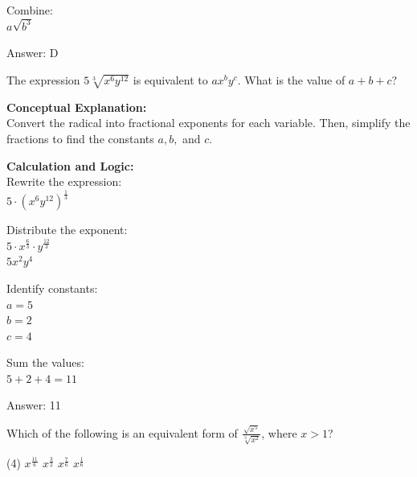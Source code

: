 \documentclass[11pt,paper=a4,answers]{exam}
\begin{document}
\begin{questions}
\begin{solution}
\vspace{10pt}

Combine: \\
$a\sqrt{b^3}$

\vspace{25pt}

Answer: \colorbox{yellow!100}{D}
\end{solution}

\vspace{40pt}

\question
The expression $5\sqrt[3]{x^6 y^{12}}$ is equivalent to $ax^b y^c$. What is the value of $a + b + c$?

\begin{solution}
\textbf{Conceptual Explanation:} \\
Convert the radical into fractional exponents for each variable. Then, simplify the fractions to find the constants $a, b,$ and $c$.

\vspace{20pt}

\textbf{Calculation and Logic:} \\
Rewrite the expression: \\
$5 \cdot (x^6 y^{12})^{\frac{1}{3}}$

\vspace{10pt}

Distribute the exponent: \\
$5 \cdot x^{\frac{6}{3}} \cdot y^{\frac{12}{3}}$ \\
$5x^2 y^4$

\vspace{10pt}

Identify constants: \\
$a = 5$ \\
$b = 2$ \\
$c = 4$

\vspace{10pt}

Sum the values: \\
$5 + 2 + 4 = 11$

\vspace{25pt}

Answer: \colorbox{yellow!100}{11}
\end{solution}

\vspace{40pt}

\question
Which of the following is an equivalent form of $\frac{\sqrt{x^5}}{\sqrt[3]{x^2}}$, where $x > 1$?
\begin{tasks}(4)
    \task $x^{\frac{11}{6}}$
    \task $x^{\frac{3}{2}}$
    \task $x^{\frac{7}{6}}$
    \task $x^{\frac{1}{6}}$
\end{tasks}


\end{questions}
\end{document}
